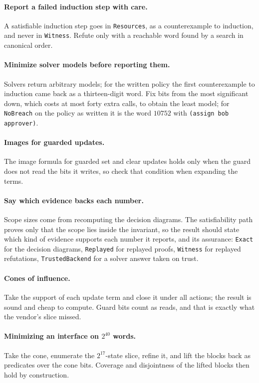 \documentclass[11pt]{article}
\newcommand{\code}[1]{\texttt{#1}}
\theoremstyle{definition}
\theoremstyle{plain}
\begin{document}
\paragraph{Report a failed induction step with care.} A satisfiable induction step goes in
\code{Resources}, as a counterexample to induction, and never in \code{Witness}. Refute only with a
reachable word found by a search in canonical order.

\paragraph{Minimize solver models before reporting them.} Solvers return arbitrary models; for the
written policy the first counterexample to induction came back as a thirteen-digit word. Fix bits from
the most significant down, which costs at most forty extra calls, to obtain the least model; for
\code{NoBreach} on the policy as written it is the word $10752$ with \code{(assign bob approver)}.

\paragraph{Images for guarded updates.} The image formula for guarded set and clear updates holds
only when the guard does not read the bits it writes, so check that condition when expanding the
terms.

\paragraph{Say which evidence backs each number.} Scope sizes come from recomputing the decision
diagrams. The satisfiability path proves only that the scope lies inside the invariant, so the
result should state which kind of evidence supports each number it reports, and its assurance:
\code{Exact} for the decision diagrams, \code{Replayed} for replayed proofs, \code{Witness} for
replayed refutations, \code{TrustedBackend} for a solver answer taken on trust.

\paragraph{Cones of influence.} Take the support of each update term and close it under all actions;
the result is sound and cheap to compute. Guard bits count as reads, and that is exactly what the
vendor's slice missed.

\paragraph{Minimizing an interface on $2^{40}$ words.} Take the cone, enumerate the $2^{17}$-state
slice, refine it, and lift the blocks back as predicates over the cone bits. Coverage and
disjointness of the lifted blocks then hold by construction.
\end{document}

